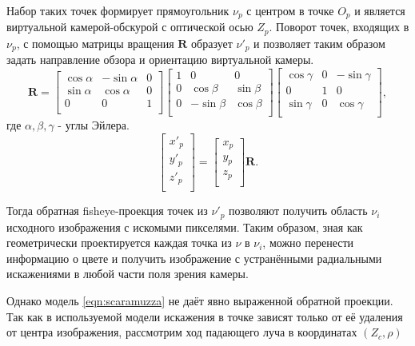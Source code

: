 Набор таких точек формирует прямоугольник $\nu_p$ с центром в точке $O_p$ и является виртуальной камерой-обскурой        %
с оптической осью $Z_p$. Поворот точек, входящих в $\nu_p$, с помощью матрицы вращения $\bm{R}$ образует $\nu'_p$ и
 позволяет таким образом задать направление обзора и ориентацию виртуальной камеры. 
\begin{equation}
    \label{eq:R}
    \bm{R} = \left[\begin{matrix}\cos{\alpha}&-\sin{\alpha}&0\\\sin{\alpha}&\cos{\alpha}&0\\0&0&1\\\end{matrix}\right]\left[\begin{matrix}1&0&0\\0&\cos{\beta}&\sin{\beta}\\0&-\sin{\beta}&\cos{\beta}\\\end{matrix}\right]\left[\begin{matrix}\cos{\gamma}&0&-\sin{\gamma}\\0&1&0\\\sin{\gamma}&0&\cos{\gamma}\\\end{matrix}\right],
\end{equation} 
где $\alpha, \beta, \gamma$ - углы Эйлера. %
\begin{equation}
    \label{eq:sweeped}
    \left[\begin{matrix}x'_p\\y'_p\\z'_p\\\end{matrix}\right] = \left[\begin{matrix}x_p\\y_p\\z_p\\\end{matrix}\right] \bm{R}.
\end{equation}  

Тогда обратная fisheye-проекция точек из $\nu'_p$ позволяют получить область $\nu_i$ исходного изображения с искомыми пикселями. 
Таким образом, зная как геометрически проектируется каждая точка из $\nu$ в $\nu_i$, можно перенести информацию о цвете и получить 
изображение с устранёнными радиальными искажениями в любой части поля зрения камеры. 

Однако модель \ref{eqn:scaramuzza} не даёт явно выраженной обратной проекции. %
Так как в используемой модели искажения в точке зависят только от её удаления от центра изображения, рассмотрим ход падающего луча 
в координатах $(Z_c, \rho)$



